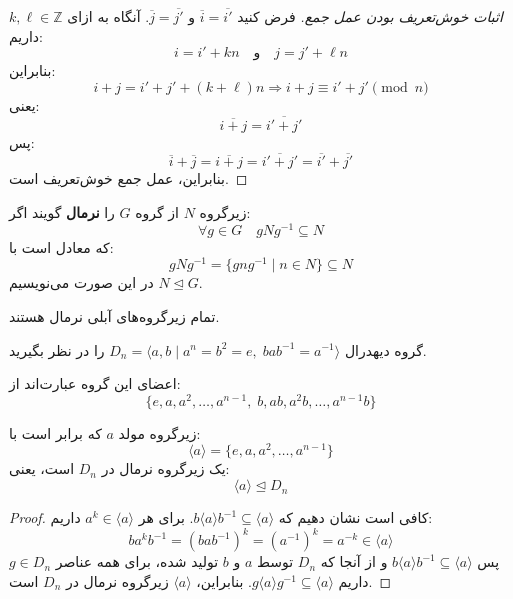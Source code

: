 \begin{frame}
    \begin{proof}[اثبات خوش‌تعریف بودن عمل جمع]
        فرض کنید \( \overline{i} = \overline{i'} \) و \( \overline{j} = \overline{j'} \).
        آنگاه به ازای \( k, \ell \in \mathbb{Z} \) داریم:
        \[
            i = i' + kn \quad \text{و} \quad j = j' + \ell n
        \]
        بنابراین:
        \[
            i + j = i' + j' + (k + \ell)n \Rightarrow i + j \equiv i' + j' \pmod{n}
        \]
        یعنی:
        \[
            \overline{i + j} = \overline{i' + j'}
        \]
        پس:
        \[
            \overline{i} + \overline{j} = \overline{i + j} = \overline{i' + j'} = \overline{i'} + \overline{j'}
        \]
        بنابراین، عمل جمع خوش‌تعریف است.
    \end{proof}

\end{frame}

\begin{frame}
    \begin{definition}
        زیرگروه \( N \) از گروه \( G \) را \textbf{نرمال} گویند اگر:
        \[
            \forall g \in G \quad gNg^{-1} \subseteq N
        \]
        که معادل است با:
        \[
            gNg^{-1} = \{ gng^{-1} \mid n \in N \} \subseteq N
        \]
        در این صورت می‌نویسیم \( N \trianglelefteq G \).

    \end{definition}
    \begin{example}
        تمام زیرگروه‌های آبلی نرمال هستند.
    \end{example}
    
\end{frame}

\begin{frame}
    \begin{example}
        گروه دیهدرال \( D_n = \langle a, b \mid a^n = b^2 = e,\; bab^{-1} = a^{-1} \rangle \) را در نظر بگیرید.

        اعضای این گروه عبارت‌اند از:
        \[
            \{ e, a, a^2, \ldots, a^{n-1},\; b, ab, a^2b, \ldots, a^{n-1}b \}
        \]

        زیرگروه مولد \( a \) که برابر است با:
        \[
            \langle a \rangle = \{ e, a, a^2, \ldots, a^{n-1} \}
        \]
        یک زیرگروه نرمال در \( D_n \) است، یعنی:
        \[
            \langle a \rangle \trianglelefteq D_n
        \]
    \end{example}

    \begin{proof}
        کافی است نشان دهیم که \( b \langle a \rangle b^{-1} \subseteq \langle a \rangle \).
        برای هر \( a^k \in \langle a \rangle \) داریم:
        \[
            b a^k b^{-1} = (bab^{-1})^k = (a^{-1})^k = a^{-k} \in \langle a \rangle
        \]
        پس \( b \langle a \rangle b^{-1} \subseteq \langle a \rangle \) و از آنجا که \( D_n \) توسط \( a \) و \( b \) تولید شده، برای همه عناصر \( g \in D_n \) داریم \( g \langle a \rangle g^{-1} \subseteq \langle a \rangle \).
        بنابراین، \( \langle a \rangle \) زیرگروه نرمال در \( D_n \) است.
    \end{proof}
\end{frame}

